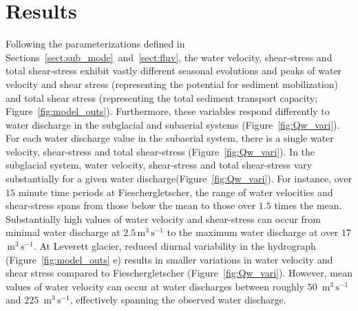 \documentclass[draft]{agujournal2019}
\newcommand{\unit}[1]{$\mathrm{#1}$}
\begin{document}
\section{Results}




 
Following the parameterizations defined in Sections~\ref{sect:sub_mode}~and~\ref{sect:fluv}, the water velocity, shear-stress and total shear-stress exhibit vastly different seasonal evolutions and peaks of water velocity and shear stress (representing the potential for sediment mobilization) and total shear stress (representing the total sediment transport capacity; Figure~\ref{fig:model_outs}).
Furthermore, these variables respond differently to water discharge in the subglacial and subaerial systems (Figure~\ref{fig:Qw_vari}).
For each water discharge value in the subaerial system, there is a single water velocity, shear-stress and total shear-stress (Figure~\ref{fig:Qw_vari}).
In the subglacial system, water velocity, shear-stress and total shear-stress vary substantially for a given water discharge(Figure~\ref{fig:Qw_vari}).
For instance, over $15$ minute time periods at Fieschergletscher, the range of water velocities and shear-stress spans from those below the mean to those over $1.5$ times the mean.
Substantially high values of water velocity and shear-stress can occur from minimal water discharge at $2.5$\,\unit{m}$^3$\,\unit{s}$^{-1}$ to the maximum water discharge at over $17$ \,\unit{m}$^3$\,\unit{s}$^{-1}$.
At Leverett glacier, reduced diurnal variability in the hydrograph  (Figure~\ref{fig:model_outs} e) results in smaller variations in water velocity and shear stress compared to Fieschergletscher (Figure~\ref{fig:Qw_vari}).
However, mean values of water velocity can occur at water discharges between roughly $50$ \,\unit{m}$^3$\,\unit{s}$^{-1}$ and $225$ \,\unit{m}$^3$\,\unit{s}$^{-1}$, effectively spanning the observed water discharge. 
\end{document}
